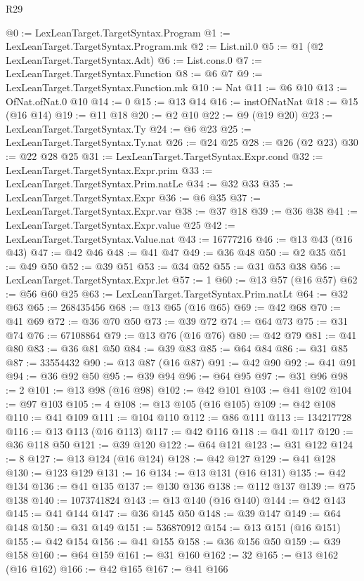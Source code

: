 \begin{lexlean}{R29}
\begin{coremodule}
@0 := LexLeanTarget.TargetSyntax.Program
@1 := LexLeanTarget.TargetSyntax.Program.mk
@2 := List.nil.{0}
@5 := @1 (@2 LexLeanTarget.TargetSyntax.Adt)
@6 := List.cons.{0}
@7 := LexLeanTarget.TargetSyntax.Function
@8 := @6 @7
@9 := LexLeanTarget.TargetSyntax.Function.mk
@10 := Nat
@11 := @6 @10
@13 := OfNat.ofNat.{0} @10
@14 := 0
@15 := @13 @14
@16 := instOfNatNat
@18 := @15 (@16 @14)
@19 := @11 @18
@20 := @2 @10
@22 := @9 (@19 @20)
@23 := LexLeanTarget.TargetSyntax.Ty
@24 := @6 @23
@25 := LexLeanTarget.TargetSyntax.Ty.nat
@26 := @24 @25
@28 := @26 (@2 @23)
@30 := @22 @28 @25
@31 := LexLeanTarget.TargetSyntax.Expr.cond
@32 := LexLeanTarget.TargetSyntax.Expr.prim
@33 := LexLeanTarget.TargetSyntax.Prim.natLe
@34 := @32 @33
@35 := LexLeanTarget.TargetSyntax.Expr
@36 := @6 @35
@37 := LexLeanTarget.TargetSyntax.Expr.var
@38 := @37 @18
@39 := @36 @38
@41 := LexLeanTarget.TargetSyntax.Expr.value @25
@42 := LexLeanTarget.TargetSyntax.Value.nat
@43 := 16777216
@46 := @13 @43 (@16 @43)
@47 := @42 @46
@48 := @41 @47
@49 := @36 @48
@50 := @2 @35
@51 := @49 @50
@52 := @39 @51
@53 := @34 @52
@55 := @31 @53 @38
@56 := LexLeanTarget.TargetSyntax.Expr.let
@57 := 1
@60 := @13 @57 (@16 @57)
@62 := @56 @60 @25
@63 := LexLeanTarget.TargetSyntax.Prim.natLt
@64 := @32 @63
@65 := 268435456
@68 := @13 @65 (@16 @65)
@69 := @42 @68
@70 := @41 @69
@72 := @36 @70 @50
@73 := @39 @72
@74 := @64 @73
@75 := @31 @74
@76 := 67108864
@79 := @13 @76 (@16 @76)
@80 := @42 @79
@81 := @41 @80
@83 := @36 @81 @50
@84 := @39 @83
@85 := @64 @84
@86 := @31 @85
@87 := 33554432
@90 := @13 @87 (@16 @87)
@91 := @42 @90
@92 := @41 @91
@94 := @36 @92 @50
@95 := @39 @94
@96 := @64 @95
@97 := @31 @96
@98 := 2
@101 := @13 @98 (@16 @98)
@102 := @42 @101
@103 := @41 @102
@104 := @97 @103
@105 := 4
@108 := @13 @105 (@16 @105)
@109 := @42 @108
@110 := @41 @109
@111 := @104 @110
@112 := @86 @111
@113 := 134217728
@116 := @13 @113 (@16 @113)
@117 := @42 @116
@118 := @41 @117
@120 := @36 @118 @50
@121 := @39 @120
@122 := @64 @121
@123 := @31 @122
@124 := 8
@127 := @13 @124 (@16 @124)
@128 := @42 @127
@129 := @41 @128
@130 := @123 @129
@131 := 16
@134 := @13 @131 (@16 @131)
@135 := @42 @134
@136 := @41 @135
@137 := @130 @136
@138 := @112 @137
@139 := @75 @138
@140 := 1073741824
@143 := @13 @140 (@16 @140)
@144 := @42 @143
@145 := @41 @144
@147 := @36 @145 @50
@148 := @39 @147
@149 := @64 @148
@150 := @31 @149
@151 := 536870912
@154 := @13 @151 (@16 @151)
@155 := @42 @154
@156 := @41 @155
@158 := @36 @156 @50
@159 := @39 @158
@160 := @64 @159
@161 := @31 @160
@162 := 32
@165 := @13 @162 (@16 @162)
@166 := @42 @165
@167 := @41 @166

\end{coremodule}
\end{lexlean}
